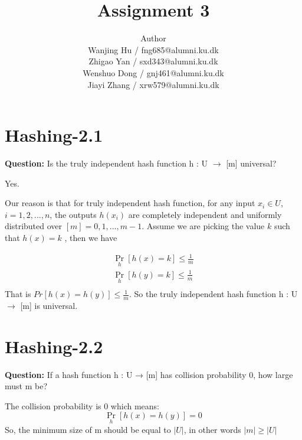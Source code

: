 \documentclass[12pt]{article}
\title{Assignment 3}
\author{Author \\
  Wanjing Hu / fng685@alumni.ku.dk  \\
  Zhigao Yan / sxd343@alumni.ku.dk  \\
  Wenshuo Dong / gnj461@alumni.ku.dk  \\
  Jiayi Zhang / xrw579@alumni.ku.dk \\
}
\begin{document}
\maketitle

\section{Hashing-2.1}
\textbf{Question: } Is the truly independent hash function h : U $\rightarrow$ [m] universal?

Yes. 

Our reason is that for truly independent hash function, for any input $x_i \in U$, $i = 1,2,...,n$, the outputs $h(x_i)$ are completely independent and uniformly distributed over $[m]={0,1,...,m-1}$. Assume we are picking the value $k$ such that $h(x)=k$ , then we have

\begin{equation}
\begin{aligned}
\mathop{Pr} \limits_{h} [h(x)=k] \leq \frac{1}{m}\\
\mathop{Pr} \limits_{h} [h(y)=k] \leq \frac{1}{m}\\
\end{aligned}
\end{equation}
That is $Pr[h(x)=h(y)] \leq \frac{1}{m}$. So the truly independent hash function h : U $\rightarrow$ [m] is universal.

\section{Hashing-2.2}
\textbf{Question:} If a hash function h : U → [m] has collision probability 0, how large must m be?

The collision probability is 0 which means:
\[\mathop{Pr} \limits_{h}[h(x)=h(y)] =0\]
So, the minimum size of m should be equal to \(|U|\), in other words \(|m|\geq|U|\)
\end{document}
